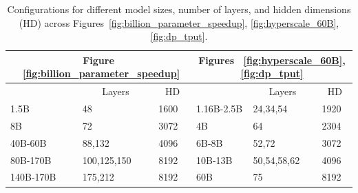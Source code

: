 \begin{table}[]
\centering
\begin{tabular}{|l|l|l|l|l|l|}
\hline
\multicolumn{3}{|c|}{Figure ~\ref{fig:billion_parameter_speedup}} & \multicolumn{3}{c|}{Figures ~\ref{fig:hyperscale_60B}, \ref{fig:dp_tput}} \\ \hline
\multicolumn{1}{|c|}{} & \multicolumn{1}{c|}{Layers} & \multicolumn{1}{c|}{HD} & \multicolumn{1}{c|}{} & \multicolumn{1}{c|}{Layers} & \multicolumn{1}{c|}{HD} \\ \hline
1.5B      & 48          & 1600 & 1.16B-2.5B  & 24,34,54    & 1920 \\ \hline
8B        & 72          & 3072 & 4B          & 64          & 2304 \\ \hline
40B-60B   & 88,132      & 4096 & 6B-8B       & 52,72       & 3072 \\ \hline
80B-170B  & 100,125,150 & 8192 & 10B-13B     & 50,54,58,62 & 4096 \\ \hline
140B-170B & 175,212     & 8192 & 60B         & 75          & 8192 \\ \hline
\end{tabular}
\caption{Configurations for different model sizes, number of layers, and hidden dimensions (HD) across Figures~\ref{fig:billion_parameter_speedup}, \ref{fig:hyperscale_60B}, \ref{fig:dp_tput}.} \label{tab:model-configuration}
\end{table}




